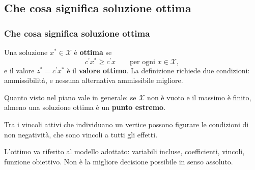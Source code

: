 

\subsection{Che cosa significa soluzione ottima}%

\begin{frame}%
%

\frametitle{Che cosa significa soluzione ottima}%
%

%


Una soluzione $x^{*}\in\mathcal{X}$ \`{e} \textbf{ottima} se
\[
c^{\prime}x^{*}\geq c^{\prime}x \qquad\text{per ogni }x\in\mathcal{X},
\]
e il valore $z^{*}=c^{\prime}x^{*}$ \`{e} il \textbf{valore ottimo}. La
definizione richiede due condizioni: ammissibilit\`{a}, e nessuna alternativa
ammissibile migliore.

\medskip

\begin{stepitemize}
\item Quanto visto nel piano vale in generale: se $\mathcal{X}$ non \`e vuoto
e il massimo \`e finito, almeno una soluzione ottima \`e un \textbf{punto
estremo}.

\item Tra i vincoli attivi che individuano un vertice possono figurare le
condizioni di non negativit\`a, che sono vincoli a tutti gli effetti.
\end{stepitemize}

\medskip

\begin{center}
{\small L'ottimo va riferito al modello adottato: variabili incluse,
coefficienti, vincoli, funzione obiettivo. Non \`{e} la migliore decisione
possibile in senso assoluto.}
\end{center}

%

\transboxout
\end{frame}%


